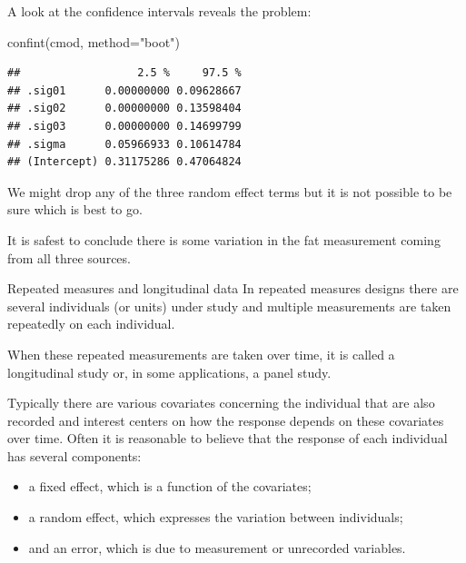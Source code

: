 \documentclass[
  ignorenonframetext,
]{beamer}
\newenvironment{Shaded}{\begin{snugshade}}{\end{snugshade}}
\newcommand{\AttributeTok}[1]{\textcolor[rgb]{0.77,0.63,0.00}{#1}}
\newcommand{\FunctionTok}[1]{\textcolor[rgb]{0.00,0.00,0.00}{#1}}
\newcommand{\NormalTok}[1]{#1}
\newcommand{\StringTok}[1]{\textcolor[rgb]{0.31,0.60,0.02}{#1}}
\begin{document}
\begin{frame}[fragile]{}
\protect\hypertarget{section-15}{}
A look at the confidence intervals reveals the problem:

\vspace{12pt}
\tiny

\begin{Shaded}
\begin{Highlighting}[]
\FunctionTok{confint}\NormalTok{(cmod, }\AttributeTok{method=}\StringTok{"boot"}\NormalTok{)}
\end{Highlighting}
\end{Shaded}

\begin{verbatim}
##                  2.5 %     97.5 %
## .sig01      0.00000000 0.09628667
## .sig02      0.00000000 0.13598404
## .sig03      0.00000000 0.14699799
## .sigma      0.05966933 0.10614784
## (Intercept) 0.31175286 0.47064824
\end{verbatim}

\vspace{12pt}
\normalsize

We might drop any of the three random effect terms but it is not
possible to be sure which is best to go.

It is safest to conclude there is some variation in the fat measurement
coming from all three sources.
\end{frame}

\begin{frame}{Repeated measures and longitudinal data}
\protect\hypertarget{repeated-measures-and-longitudinal-data}{}
In repeated measures designs there are several individuals (or units)
under study and multiple measurements are taken repeatedly on each
individual.

When these repeated measurements are taken over time, it is called a
longitudinal study or, in some applications, a panel study.

Typically there are various covariates concerning the individual that
are also recorded and interest centers on how the response depends on
these covariates over time. Often it is reasonable to believe that the
response of each individual has several components:

\begin{itemize}
\item
  a fixed effect, which is a function of the covariates;
\item
  a random effect, which expresses the variation between individuals;
\item
  and an error, which is due to measurement or unrecorded variables.
\end{itemize}
\end{frame}
\end{document}
